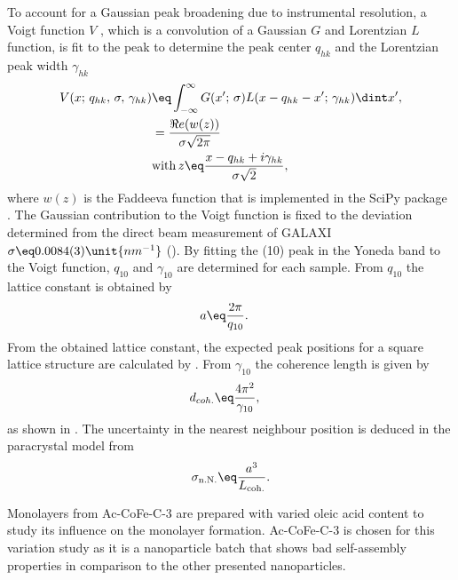 \documentclass[\main/dresen_thesis.tex]{subfiles}
\begin{document}
      To account for a Gaussian peak broadening due to instrumental resolution, a Voigt function $V$ \cite{Olver_2010_Handb}, which is a convolution of a Gaussian $G$ and Lorentzian $L$ function, is fit to the peak to determine the peak center $q_{hk}$ and the Lorentzian peak width $\gamma_{hk}$
      \begin{align}
        \begin{split}
          V(x;\,q_{hk},\,\sigma,\,\gamma_{hk}) &\eq \int_{-\infty}^\infty G(x^\prime;\,\sigma) L(x - q_{hk} - x^\prime;\, \gamma_{hk}) \dint x^\prime,\\
          &= \frac{\Re e (w(z))}{\sigma \sqrt{2 \pi}}\\
          &\mathrm{with\,} z\eq \frac{x - q_{hk} + i\gamma_{hk}}{\sigma \sqrt{2}},
        \end{split}
      \end{align}
      where $w(z)$ is the Faddeeva function that is implemented in the SciPy package \cite{Oliphant_2006_Guide}.
      The Gaussian contribution to the Voigt function is fixed to the deviation determined from the direct beam measurement of GALAXI $\sigma \eq 0.0084(3) \unit{nm^{-1}}$ ().
      By fitting the (10) peak in the Yoneda band to the Voigt function, $q_{10}$ and $\gamma_{10}$ are determined for each sample.
      From $q_{10}$ the lattice constant is obtained by
      \begin{align}
        a &\eq \frac{2 \pi}{q_{10}}.
      \end{align}
      From the obtained lattice constant, the expected peak positions for a square lattice structure are calculated by .
      From $\gamma_{10}$ the coherence length is given by
      \begin{align}
        d_{coh.} &\eq \frac{4 \pi^2}{\gamma_{10}},
      \end{align}
      as shown in .
      The uncertainty in the nearest neighbour position is deduced in the paracrystal model from
      \begin{align}
        \sigma_{\mathrm{n.N.}} \eq \frac{a^3}{L_\mathrm{coh.}}.
      \end{align}

      Monolayers from Ac-CoFe-C-3 are prepared with varied oleic acid content to study its influence on the monolayer formation.
      Ac-CoFe-C-3 is chosen for this variation study as it is a nanoparticle batch that shows bad self-assembly properties in comparison to the other presented nanoparticles.
\end{document}
